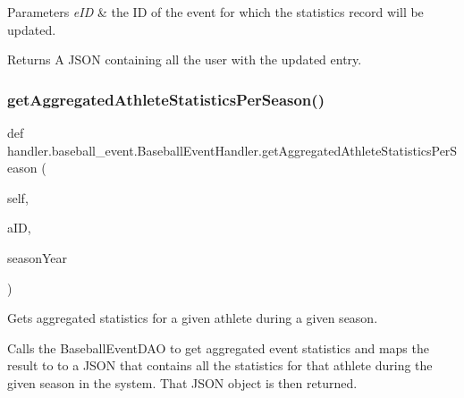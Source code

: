 \begin{DoxyParams}{Parameters}
{\em e\+ID} & the ID of the event for which the statistics record will be updated.\\
\hline
\end{DoxyParams}
\begin{DoxyReturn}{Returns}
A J\+S\+ON containing all the user with the updated entry. 
\end{DoxyReturn}
\mbox{\label{classhandler_1_1baseball__event_1_1_baseball_event_handler_adb2324b1ab5fd1dab159be82e8760530}} 
\subsubsection{\texorpdfstring{get\+Aggregated\+Athlete\+Statistics\+Per\+Season()}{getAggregatedAthleteStatisticsPerSeason()}}
{\footnotesize\ttfamily def handler.\+baseball\+\_\+event.\+Baseball\+Event\+Handler.\+get\+Aggregated\+Athlete\+Statistics\+Per\+Season (\begin{DoxyParamCaption}\item[{}]{self,  }\item[{}]{a\+ID,  }\item[{}]{season\+Year }\end{DoxyParamCaption})}



Gets aggregated statistics for a given athlete during a given season. 

Calls the Baseball\+Event\+D\+AO to get aggregated event statistics and maps the result to to a J\+S\+ON that contains all the statistics for that athlete during the given season in the system. That J\+S\+ON object is then returned.


